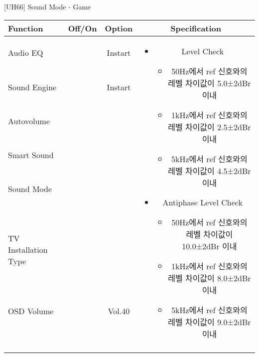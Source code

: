 \begin{frame}[t]{[UH66] Sound Mode - Game}
\begin{tiny}
\begin{tabular}{@{}lccc@{}}
\toprule
Function & Off/On & Option & Specification \\
\midrule
Audio EQ & \color{black}{Off} & Instart &
\multirow{10}{60mm}{
\begin{itemize}
\item Level Check
  \begin{itemize}
  \item 50Hz에서 ref 신호와의 레벨 차이값이 5.0±2dBr 이내
  \item 1kHz에서 ref 신호와의 레벨 차이값이 2.5±2dBr 이내
  \item 5kHz에서 ref 신호와의 레벨 차이값이 4.5±2dBr 이내
  \end{itemize}
\item Antiphase Level Check
  \begin{itemize}
  \item 50Hz에서 ref 신호와의 레벨 차이값이 10.0±2dBr 이내
  \item 1kHz에서 ref 신호와의 레벨 차이값이 8.0±2dBr 이내
  \item 5kHz에서 ref 신호와의 레벨 차이값이 9.0±2dBr 이내
  \end{itemize}
\end{itemize}
} \\
Sound Engine & \color{blue}{On} & Instart & \\
Autovolume & \color{black}{Off} & & \\
Smart Sound & \color{black}{Off} & & \\
Sound Mode & \color{blue}{On} & \color{blue}{Game} & \\
TV Installation Type & \color{blue}{On} & \color{black}{Standtype1} & \\
OSD Volume & \color{blue}{On} & Vol.40 & \\
& & & \\
& & & \\
& & & \\
& & & \\
\midrule
\end{tabular}
\end{tiny}

\end{frame}
